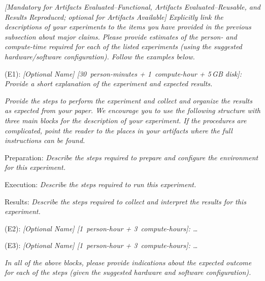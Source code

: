 \emph{[Mandatory for \emph{Artifacts Evaluated--Functional},
  \emph{Artifacts Evaluated--Reusable}, and \emph{Results Reproduced};
  optional for \emph{Artifacts Available}]}
%
\emph{Explicitly link the descriptions of your experiments to the
items you have provided in the previous subsection about major claims.
Please provide estimates of the person- and compute-time required for
each of the listed experiments (using the suggested hardware/software
configuration).  Follow the examples below.}

\bigskip
\begin{compactitem}
\item[(E1):]
  \emph{[Optional Name] [30~person-minutes + 1~compute-hour + 5\,GB
    disk]: Provide a short explanation of the experiment and expected
  results.}

  \emph{Provide the steps to perform the experiment and collect and
  organize the results as expected from your paper.  We encourage you
  to use the following structure with three main blocks for the
  description of your experiment.  If the procedures are complicated,
  point the reader to the places in your artifacts where the full
  instructions can be found.}

  \begin{asparadesc}
  \item[Preparation:] \emph{Describe the steps required to prepare and
  configure the environment for this experiment.}

  \item[Execution:] \emph{Describe the steps required to run this
  experiment.}

  \item[Results:] \emph{Describe the steps required to collect and
  interpret the results for this experiment.}
  \end{asparadesc}

\item[(E2):] \emph{[Optional Name] [1~person-hour + 3~compute-hours]: \ldots}

\item[(E3):] \emph{[Optional Name] [1~person-hour + 3~compute-hours]: \ldots}
\end{compactitem}
\bigskip

\emph{In all of the above blocks, please provide indications about the
expected outcome for each of the steps (given the suggested hardware
and software configuration).}



